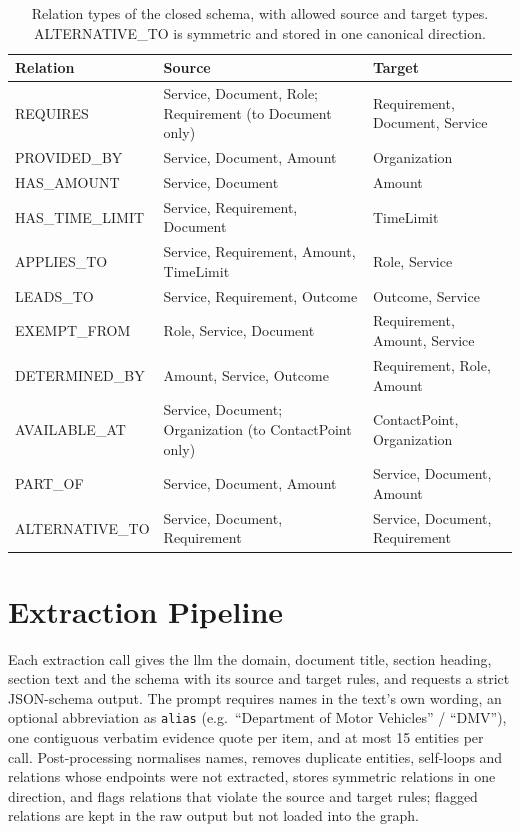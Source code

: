 \begin{table}[ht]
    \centering
    \small
    \caption{Relation types of the closed schema, with allowed source and target
             types. ALTERNATIVE\_TO is symmetric and stored in one canonical
             direction.}
    \label{tab:kg:relations}
    \begin{tabular}{l>{\raggedright\arraybackslash}p{}>{\raggedright\arraybackslash}p{}}
        \toprule
        Relation & Source & Target \\
        \midrule
        REQUIRES       & Service, Document, Role; Requirement (to Document only) & Requirement, Document, Service \\
        PROVIDED\_BY   & Service, Document, Amount & Organization \\
        HAS\_AMOUNT    & Service, Document & Amount \\
        HAS\_TIME\_LIMIT & Service, Requirement, Document & TimeLimit \\
        APPLIES\_TO    & Service, Requirement, Amount, TimeLimit & Role, Service \\
        LEADS\_TO      & Service, Requirement, Outcome & Outcome, Service \\
        EXEMPT\_FROM   & Role, Service, Document & Requirement, Amount, Service \\
        DETERMINED\_BY & Amount, Service, Outcome & Requirement, Role, Amount \\
        AVAILABLE\_AT  & Service, Document; Organization (to ContactPoint only) & ContactPoint, Organization \\
        PART\_OF       & Service, Document, Amount & Service, Document, Amount \\
        ALTERNATIVE\_TO & Service, Document, Requirement & Service, Document, Requirement \\
        \bottomrule
    \end{tabular}
\end{table}


\section{Extraction Pipeline}\label{sec:kg:extraction}

Each extraction call gives the \gls{llm} the domain, document title, section
heading, section text and the schema with its source and target rules, and
requests a strict JSON-schema output. The prompt requires names in the text's own
wording, an optional abbreviation as \texttt{alias} (e.g.\ ``Department of Motor
Vehicles'' / ``DMV''), one contiguous verbatim evidence quote per item, and at most
15 entities per call. Post-processing normalises names, removes duplicate entities,
self-loops and relations whose endpoints were not extracted, stores symmetric
relations in one direction, and flags relations that violate the source and target
rules; flagged relations are kept in the raw output but not loaded into the graph.


